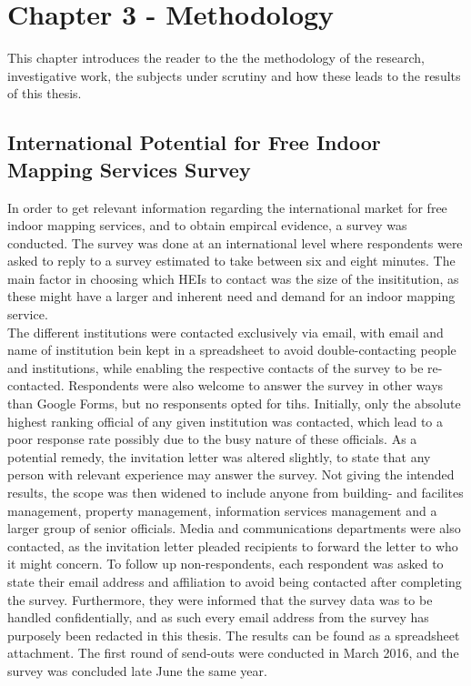 \chapter{Chapter 3 - Methodology}
This chapter introduces the reader to the the methodology of the research, investigative work, the subjects under scrutiny and how these leads to the results of this thesis.

\section{International Potential for Free Indoor Mapping Services Survey}
In order to get relevant information regarding the international market for free indoor mapping services, and to obtain empircal evidence, a survey was conducted. The survey was done at an international level where respondents were asked to reply to a survey estimated to take between six and eight minutes. The main factor in choosing which HEIs to contact was the size of the insititution, as these might have a larger and inherent need and demand for an indoor mapping service. 
\newline
\\
The different institutions were contacted exclusively via email, with email and name of institution bein kept in a spreadsheet to avoid double-contacting people and institutions, while enabling the respective contacts of the survey to be re-contacted. Respondents were also welcome to answer the survey in other ways than Google Forms, but no responsents opted for tihs. Initially, only the absolute highest ranking official of any given institution was contacted, which lead to a poor response rate possibly due to the busy nature of these officials. As a potential remedy, the invitation letter was altered slightly, to state that any person with relevant experience may answer the survey. Not giving the intended results, the scope was then widened to include anyone from building- and facilites management, property management, information services management and a larger group of senior officials. Media and communications departments were also contacted, as the invitation letter pleaded recipients to forward the letter to who it might concern. To follow up non-respondents, each respondent was asked to state their email address and affiliation to avoid being contacted after completing the survey. Furthermore, they were informed that the survey data was to be handled confidentially, and as such every email address from the survey has purposely been redacted in this thesis. The results can be found as a spreadsheet attachment. The first round of send-outs were conducted in March 2016, and the survey was concluded late June the same year. 

